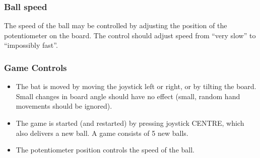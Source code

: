 \documentclass[a4paper]{article}
\begin{document}
\begin{center}
\end{center}

\subsubsection{Ball speed}
The speed of the ball may be controlled by adjusting the position of
the potentiometer on the board.  The control should adjust speed from
``very slow'' to ``impossibly fast''.

\subsubsection{Game Controls}
\begin{itemize}
\item The bat is moved by moving the joystick left or right, or by
  tilting the board.  Small changes in board angle should have no
  effect (small, random hand movements should be ignored).
\item The game is started (and restarted) by pressing joystick CENTRE,
  which also delivers a new ball. A game consists of 5 new balls.
\item The potentiometer position controls the speed of the ball.
\end{itemize}

\clearpage
\end{document}
